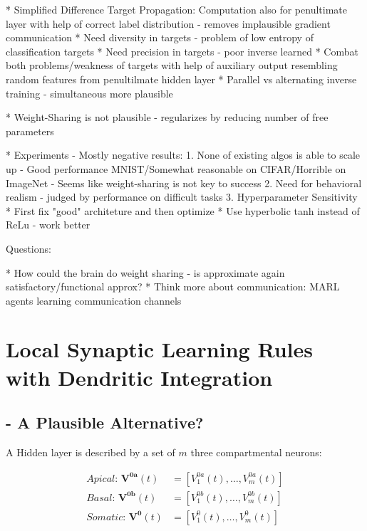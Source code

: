 \documentclass[colorinlistoftodos]{article}
\theoremstyle{definition}
\begin{document}
* Simplified Difference Target Propagation: Computation also for penultimate layer with help of correct label distribution - removes implausible gradient communication
    * Need diversity in targets - problem of low entropy of classification targets
    * Need precision in targets - poor inverse learned
    * Combat both problems/weakness of targets with help of auxiliary output resembling random features from penultilmate hidden layer
    * Parallel vs alternating inverse training - simultaneous more plausible

* Weight-Sharing is not plausible - regularizes by reducing number of free parameters

* Experiments - Mostly negative results:
    1. None of existing algos is able to scale up - Good performance MNIST/Somewhat reasonable on CIFAR/Horrible on ImageNet - Seems like weight-sharing is not key to success
    2. Need for behavioral realism - judged by performance on difficult tasks
    3. Hyperparameter Sensitivity
        * First fix "good" architeture and then optimize
        * Use hyperbolic tanh instead of ReLu - work better


Questions:

* How could the brain do weight sharing - is approximate again satisfactory/functional approx?
* Think more about communication: MARL agents learning communication channels

\newpage
\section{Local Synaptic Learning Rules with Dendritic Integration}

\subsection*{\citet{guerguiev2017} - A Plausible Alternative?}

A Hidden layer is described by a set of $m$ three compartmental neurons:

\begin{align*}
	\textit{Apical:  } \mathbf{V^{0a}}(t) &= [V_1^{0a}(t), \dots, V_m^{0a}(t)]\\
	\textit{Basal:  } \mathbf{V^{0b}}(t) &= [V_1^{0b}(t), \dots, V_m^{0b}(t)]\\
	\textit{Somatic:  }\mathbf{V^{0}}(t) &= [V_1^{0}(t), \dots, V_m^{0}(t)]
\end{align*}
\end{document}
